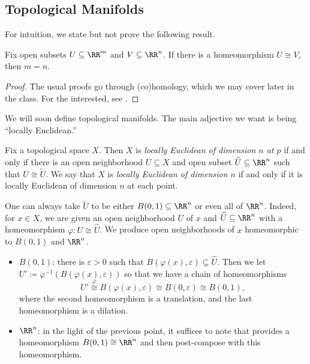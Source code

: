 \documentclass[../notes.tex]{subfiles}
\begin{document}
\subsection{Topological Manifolds}
For intuition, we state but not prove the following result.
\begin{theorem} \label{thm:top-inv-dim}
	Fix open subsets $U\subseteq\RR^m$ and $V\subseteq\RR^n$. If there is a homeomorphism $U\cong V$, then $m=n$.
\end{theorem}
\begin{proof}
	The usual proofs go through (co)homology, which we may cover later in the class. For the interested, see \cite[Proposition~3.50]{elber-alg-top}.
\end{proof}
We will soon define topological manifolds. The main adjective we want is being ``locally Euclidean.''
\begin{definition}
	Fix a topological space $X$. Then $X$ is \textit{locally Euclidean of dimension $n$ at $p$} if and only if there is an open neighborhood $U\subseteq X$ and open subset $\widetilde U\subseteq\RR^n$ such that $U\cong\widetilde U$. We say that $X$ is \textit{locally Euclidean of dimension $n$} if and only if it is locally Euclidean of dimension $n$ at each point.
\end{definition}
\begin{remark} \label{rem:better-chart}
	One can always take $\widetilde U$ to be either $B(0,1)\subseteq\RR^n$ or even all of $\RR^n$. Indeed, for $x\in X$, we are given an open neighborhood $U$ of $x$ and $\widehat U\subseteq\RR^n$ with a homeomorphism $\varphi\colon U\cong\widehat U$. We produce open neighborhoods of $x$ homeomorphic to $B(0,1)$ and $\RR^n$.
	\begin{itemize}
		\item $B(0,1)$: there is $\varepsilon>0$ such that $B(\varphi(x),\varepsilon)\subseteq\widehat U$. Then we let $U'\coloneqq\varphi^{-1}(B(\varphi(x),\varepsilon))$ so that we have a chain of homeomorphisms
		\[U'\stackrel\varphi\cong B(\varphi(x),\varepsilon)\cong B(0,\varepsilon)\cong B(0,1),\]
		where the second homeomorphism is a translation, and the last homeomorphism is a dilation.
		\item $\RR^n$: in the light of the previous point, it suffices to note that  provides a homeomorphism $B(0,1)\cong\RR^n$ and then post-compose with this homeomorphism.
	\end{itemize}
\end{remark}
\end{document}
